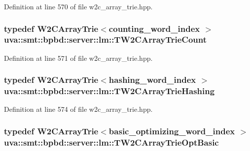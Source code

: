 Definition at line 570 of file w2c\+\_\+array\+\_\+trie.\+hpp.

\hypertarget{namespaceuva_1_1smt_1_1bpbd_1_1server_1_1lm_a1b693076361e3f43ba4d5ffd1e2f7036}{}
\subsubsection[{T\+W2\+C\+Array\+Trie\+Count}]{\setlength{\rightskip}{0pt plus 5cm}typedef {\bf W2\+C\+Array\+Trie}$<${\bf counting\+\_\+word\+\_\+index} $>$ {\bf uva\+::smt\+::bpbd\+::server\+::lm\+::\+T\+W2\+C\+Array\+Trie\+Count}}\label{namespaceuva_1_1smt_1_1bpbd_1_1server_1_1lm_a1b693076361e3f43ba4d5ffd1e2f7036}


Definition at line 571 of file w2c\+\_\+array\+\_\+trie.\+hpp.

\hypertarget{namespaceuva_1_1smt_1_1bpbd_1_1server_1_1lm_a74897a162a84aea39a51068c824cdba8}{}
\subsubsection[{T\+W2\+C\+Array\+Trie\+Hashing}]{\setlength{\rightskip}{0pt plus 5cm}typedef {\bf W2\+C\+Array\+Trie}$<${\bf hashing\+\_\+word\+\_\+index} $>$ {\bf uva\+::smt\+::bpbd\+::server\+::lm\+::\+T\+W2\+C\+Array\+Trie\+Hashing}}\label{namespaceuva_1_1smt_1_1bpbd_1_1server_1_1lm_a74897a162a84aea39a51068c824cdba8}


Definition at line 574 of file w2c\+\_\+array\+\_\+trie.\+hpp.

\hypertarget{namespaceuva_1_1smt_1_1bpbd_1_1server_1_1lm_a77ed7beadfafcc3c91c7ad86702e820e}{}
\subsubsection[{T\+W2\+C\+Array\+Trie\+Opt\+Basic}]{\setlength{\rightskip}{0pt plus 5cm}typedef {\bf W2\+C\+Array\+Trie}$<${\bf basic\+\_\+optimizing\+\_\+word\+\_\+index} $>$ {\bf uva\+::smt\+::bpbd\+::server\+::lm\+::\+T\+W2\+C\+Array\+Trie\+Opt\+Basic}}\label{namespaceuva_1_1smt_1_1bpbd_1_1server_1_1lm_a77ed7beadfafcc3c91c7ad86702e820e}


